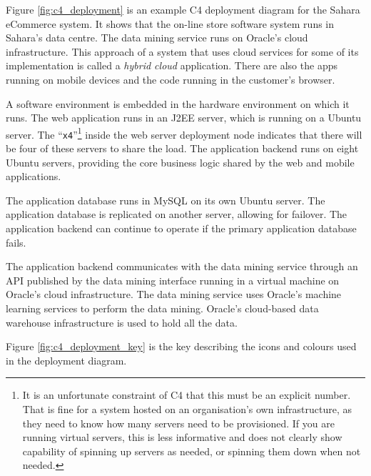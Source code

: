 \noindent
Figure \ref{fig:c4_deployment} is an example C4 deployment diagram for the Sahara eCommerce system.
It shows that the on-line store software system runs in Sahara's data centre.
The data mining service runs on Oracle's cloud infrastructure.
This approach of a system that uses cloud services for some of its implementation is called a \emph{hybrid cloud} application.
There are also the apps running on mobile devices and the code running in the customer's browser.

A software environment is embedded in the hardware environment on which it runs.
The web application runs in an  J2EE server, which is running on a Ubuntu server.
The ``\texttt{x4}''\footnote{It is an unfortunate constraint of C4 that this must be an explicit number.
That is fine for a system hosted on an organisation's own infrastructure, as they need to know how many servers need to be provisioned.
If you are running virtual servers, this is less informative and does not clearly show capability of spinning up
servers as needed, or spinning them down when not needed.}
inside the web server deployment node indicates that there will be four of these servers to share the load.
The application backend runs on eight Ubuntu servers, providing the core business logic shared by the web and mobile applications.

The application database runs in MySQL on its own Ubuntu server.
The application database is replicated on another server, allowing for failover.
The application backend can continue to operate if the primary application database fails.

The application backend communicates with the data mining service
through an API published by the data mining interface running in a virtual machine on Oracle's cloud infrastructure.
The data mining service uses Oracle's machine learning services to perform the data mining.
Oracle's cloud-based data warehouse infrastructure is used to hold all the data.

Figure \ref{fig:c4_deployment_key} is the key describing the icons and colours used in the deployment diagram.

